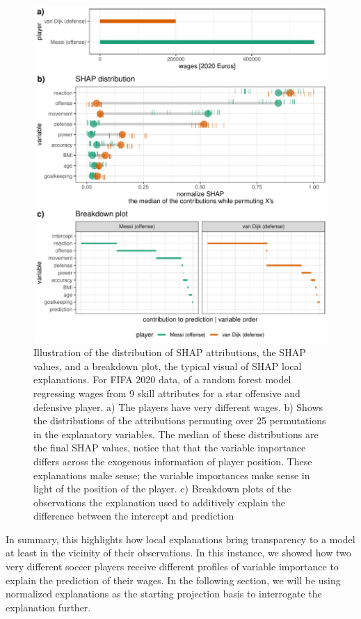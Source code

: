 \documentclass[
]{article}
\begin{document}
\begin{figure}

{\centering \includegraphics{./figures/shap_distr_bd} 

}

\caption{Illustration of the distribution of SHAP attributions, the SHAP values, and a breakdown plot, the typical visual of SHAP local explanations. For FIFA 2020 data, of a random forest model regressing wages from 9 skill attributes for a star offensive and defensive player. a) The players have very different wages. b) Shows the distributions of the attributions permuting over 25 permutations in the explanatory variables. The median of these distributions are the final SHAP values, notice that that the variable importance differs across the exogenous information of player position. These explanations make sense; the variable importances make sense in light of the position of the player. c) Breakdown plots of the observations the explanation used to additively explain the difference between the intercept and prediction}\label{fig:shapdistrbd}
\end{figure}

In summary, this highlights how local explanations bring transparency to a model at least in the vicinity of their observations. In this instance, we showed how two very different soccer players receive different profiles of variable importance to explain the prediction of their wages. In the following section, we will be using normalized explanations as the starting projection basis to interrogate the explanation further.
\end{document}
